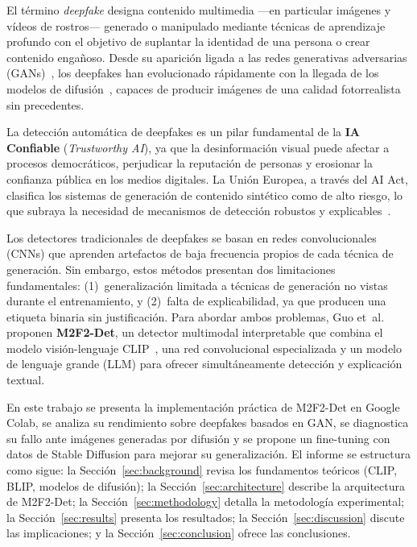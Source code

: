 \documentclass[pdflatex,sn-mathphys-num]{sn-jnl}
\begin{document}
El término \emph{deepfake} designa contenido multimedia ---en particular imágenes y vídeos de rostros--- generado o manipulado mediante técnicas de aprendizaje profundo con el objetivo de suplantar la identidad de una persona o crear contenido engañoso. Desde su aparición ligada a las redes generativas adversarias (GANs)~\cite{goodfellow2014generative}, los deepfakes han evolucionado rápidamente con la llegada de los modelos de difusión~\cite{rombach2022latentdiffusion}, capaces de producir imágenes de una calidad fotorrealista sin precedentes.

La detección automática de deepfakes es un pilar fundamental de la \textbf{IA Confiable} (\emph{Trustworthy AI}), ya que la desinformación visual puede afectar a procesos democráticos, perjudicar la reputación de personas y erosionar la confianza pública en los medios digitales. La Unión Europea, a través del AI Act, clasifica los sistemas de generación de contenido sintético como de alto riesgo, lo que subraya la necesidad de mecanismos de detección robustos y explicables~\cite{euaiact2024}.

Los detectores tradicionales de deepfakes se basan en redes convolucionales (CNNs) que aprenden artefactos de baja frecuencia propios de cada técnica de generación. Sin embargo, estos métodos presentan dos limitaciones fundamentales: (1)~generalización limitada a técnicas de generación no vistas durante el entrenamiento, y (2)~falta de explicabilidad, ya que producen una etiqueta binaria sin justificación. Para abordar ambos problemas, Guo et~al.~\cite{guo2025m2f2det} proponen \textbf{M2F2-Det}, un detector multimodal interpretable que combina el modelo visión-lenguaje CLIP~\cite{radford2021clip}, una red convolucional especializada y un modelo de lenguaje grande (LLM) para ofrecer simultáneamente detección y explicación textual.

En este trabajo se presenta la implementación práctica de M2F2-Det en Google Colab, se analiza su rendimiento sobre deepfakes basados en GAN, se diagnostica su fallo ante imágenes generadas por difusión y se propone un fine-tuning con datos de Stable Diffusion para mejorar su generalización. El informe se estructura como sigue: la Sección~\ref{sec:background} revisa los fundamentos teóricos (CLIP, BLIP, modelos de difusión); la Sección~\ref{sec:architecture} describe la arquitectura de M2F2-Det; la Sección~\ref{sec:methodology} detalla la metodología experimental; la Sección~\ref{sec:results} presenta los resultados; la Sección~\ref{sec:discussion} discute las implicaciones; y la Sección~\ref{sec:conclusion} ofrece las conclusiones.
\end{document}
